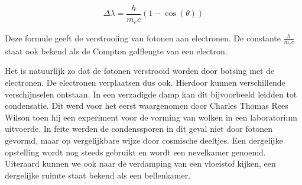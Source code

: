 \begin{equation}
\Delta\lambda=\frac{h}{m_{e}c}\left(1-\cos\left(\theta\right)\right)
\end{equation}


Deze formule geeft de verstrooiing van fotonen aan electronen. De
constante $\frac{h}{m_{e}c}$ staat ook bekend als de Compton golflengte
van een electron.

Het is natuurlijk zo dat de fotonen verstrooid worden door botsing
met de electronen. De electronen verplaatsen dus ook. Hierdoor kunnen
verschillende verschijnselen ontstaan. In een verzadigde damp kan
dit bijvoorbeeld leidden tot condensatie. Dit werd voor het eerst
waargenomen door Charles Thomas Rees Wilson toen hij een experiment
voor de vorming van wolken in een laboratorium uitvoerde. In feite
werden de condenssporen in dit geval niet door fotonen gevormd, maar
op vergelijkbare wijze door cosmische deeltjes. Een dergelijke opstelling
wordt nog steeds gebruikt en wordt een nevelkamer genoemd. Uiteraard
kunnen we ook naar de verdamping van een vloeistof kijken, een dergelijke
ruimte staat bekend als een bellenkamer. 


